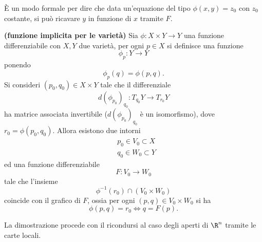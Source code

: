 \documentclass[10pt, letterpaper]{report}
\begin{document}
È un modo formale per dire che data un'equazione del tipo $\phi(x,y)=z_0$ con $z_0$ costante, si può ricavare $y$ in funzione di $x$ tramite $F$.\begin{teorema}\textbf{(funzione implicita per le varietà)}
    Sia $\phi:X\times Y\rightarrow Y$ una funzione differenziabile con $X,Y$ due varietà, per ogni $p\in X$ si definisce una funzione\begin{equation}
        \phi_p:Y\rightarrow Y
    \end{equation}
    ponendo\begin{equation}
        \phi_p(q)=\phi(p,q).
    \end{equation}
    Si consideri $(p_0,q_0)\in X\times Y$ tale che il differenziale\begin{equation}
        d(\phi_{p_0})_{q_0}:T_{q_0}Y\longrightarrow T_{r_0}Y
    \end{equation}
    ha matrice associata invertibile ($d(\phi_{p_0})_{q_0}$ è un isomorfismo), dove $r_0=\phi(p_0,q_0)$. Allora esistono due intorni
    \begin{align}
        &p_0\in V_0\subset X\\
        &q_0\in W_0\subset Y
    \end{align}
    ed una funzione differenziabile\begin{equation}
        F:V_0\longrightarrow W_0
    \end{equation}
    tale che l'insieme\begin{equation}
        \phi^{-1}(r_0)\cap (V_0\times W_0)
    \end{equation}
    coincide con il grafico di $F$, ossia per ogni $(p,q)\in V_0\times W_0$ si ha 
    \begin{equation}
        \phi(p,q)=r_0\iff q=F(p).
    \end{equation}
\end{teorema}
La dimostrazione procede con il ricondursi al caso degli aperti di $\R^n$ tramite le carte locali.
\end{document}
